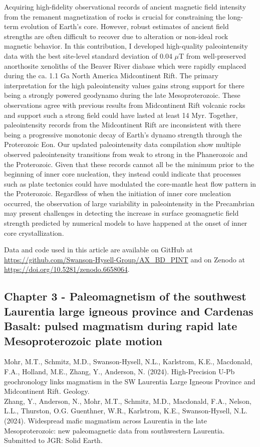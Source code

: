 \documentclass{ucbthesis}
\begin{document}
\begin{frontmatter}
\begin{preface}
Acquiring high-fidelity observational records of ancient magnetic field intensity from the remanent magnetization of rocks is crucial for constraining the long-term evolution of Earth’s core. However, robust estimates of ancient field strengths are often difficult to recover due to alteration or non-ideal rock magnetic behavior. In this contribution, I developed high-quality paleointensity data with the best site-level standard deviation of 0.04 $\mu$T from well-preserved anorthosite xenoliths of the Beaver River diabase which were rapidly emplaced during the ca. 1.1 Ga North America Midcontinent Rift. The primary interpretation for the high paleointensity values gains strong support for there being a strongly powered geodynamo during the late Mesoproterozoic. These observations agree with previous results from Midcontinent Rift volcanic rocks and support such a strong field could have lasted at least 14 Myr. Together, paleointensity records from the Midcontinent Rift are inconsistent with there being a progressive monotonic decay of Earth’s dynamo strength through the Proterozoic Eon.
Our updated paleointensity data compilation show multiple observed paleointensity transitions from weak to strong in the Phanerozoic and the Proterozoic. Given that these records cannot all be the minimum prior to the beginning of inner core nucleation, they instead could indicate that processes such as plate tectonics could have modulated the core-mantle heat flow pattern in the Proterozoic. Regardless of when the initiation of inner core nucleation occurred, the observation of large variability in paleointensity in the Precambrian may present challenges in detecting the increase in surface geomagnetic field strength predicted by numerical models to have happened at the onset of inner core crystallization.

Data and code used in this article are available on GitHub at \url{https://github.com/Swanson-Hysell-Group/AX_BD_PINT} and on Zenodo at \url{https://doi.org/10.5281/zenodo.6658064}.
 
\clearpage 

\subsection{Chapter 3 - Paleomagnetism of the southwest Laurentia large igneous province and Cardenas Basalt: pulsed magmatism during rapid late Mesoproterozoic plate motion}

Mohr, M.T., Schmitz, M.D., Swanson-Hysell, N.L., Karlstrom, K.E., Macdonald, F.A., Holland, M.E., Zhang, Y., Anderson, N. (2024). High-Precision U-Pb geochronology links magmatism in the SW Laurentia Large Igneous Province and Midcontinent Rift. Geology. 
\\
\noindent Zhang, Y., Anderson, N., Mohr, M.T., Schmitz, M.D., Macdonald, F.A., Nelson, L.L., Thurston, O.G. Guenthner, W.R., Karlstrom, K.E., Swanson-Hysell, N.L. (2024). Widespread mafic magmatism across Laurentia in the late Mesoproterozoic: new paleomagnetic data from southwestern Laurentia. Submitted to JGR: Solid Earth. 
\\


\end{preface}
\end{frontmatter}
\end{document}
